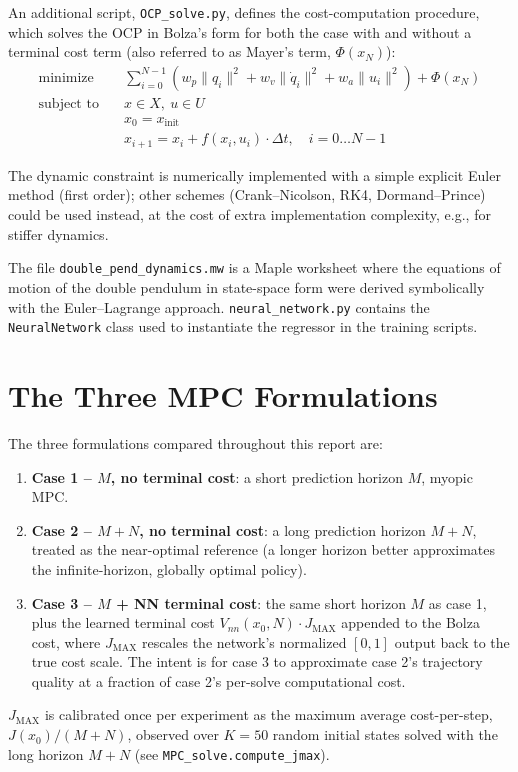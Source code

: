 \documentclass[11pt,a4paper]{article}
\begin{document}
An additional script, \texttt{OCP\_solve.py}, defines the cost-computation procedure, which
solves the OCP in Bolza's form for both the case with and without a terminal cost term (also
referred to as Mayer's term, $\Phi(x_N)$):
\begin{align*}
  \text{minimize} \quad & \sum_{i=0}^{N-1} \left( w_p \lVert q_i \rVert^2 + w_v \lVert \dot q_i \rVert^2 + w_a \lVert u_i \rVert^2 \right) + \Phi(x_N) \\
  \text{subject to} \quad & x \in X,\ u \in U \\
  & x_0 = x_{\text{init}} \\
  & x_{i+1} = x_i + f(x_i, u_i) \cdot \Delta t, \quad i = 0 \ldots N-1
\end{align*}

The dynamic constraint is numerically implemented with a simple explicit Euler method (first
order); other schemes (Crank--Nicolson, RK4, Dormand--Prince) could be used instead, at the cost
of extra implementation complexity, e.g., for stiffer dynamics.

The file \texttt{double\_pend\_dynamics.mw} is a Maple worksheet where the equations of motion
of the double pendulum in state-space form were derived symbolically with the Euler--Lagrange
approach. \texttt{neural\_network.py} contains the \texttt{NeuralNetwork} class used to
instantiate the regressor in the training scripts.

\section{The Three MPC Formulations}

The three formulations compared throughout this report are:
\begin{enumerate}
  \item \textbf{Case 1 -- $M$, no terminal cost}: a short prediction horizon $M$, myopic MPC.
  \item \textbf{Case 2 -- $M+N$, no terminal cost}: a long prediction horizon $M+N$, treated as
        the near-optimal reference (a longer horizon better approximates the infinite-horizon,
        globally optimal policy).
  \item \textbf{Case 3 -- $M$ + NN terminal cost}: the same short horizon $M$ as case 1, plus the
        learned terminal cost $V_{nn}(x_0, N) \cdot J_{\text{MAX}}$ appended to the Bolza cost,
        where $J_{\text{MAX}}$ rescales the network's normalized $[0,1]$ output back to the true
        cost scale. The intent is for case 3 to approximate case 2's trajectory quality at a
        fraction of case 2's per-solve computational cost.
\end{enumerate}
$J_{\text{MAX}}$ is calibrated once per experiment as the maximum average cost-per-step,
$J(x_0)/(M{+}N)$, observed over $K=50$ random initial states solved with the long horizon
$M+N$ (see \texttt{MPC\_solve.compute\_jmax}).
\end{document}
